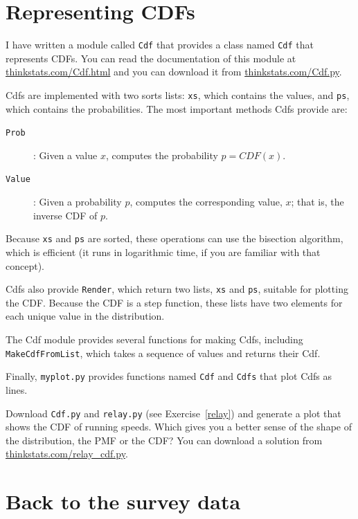 \documentclass[12pt]{book}
\begin{document}
\section{Representing CDFs}

I have written a module called {\tt Cdf} that provides a class named
{\tt Cdf} that represents CDFs.  You can read the documentation of
this module at \url{thinkstats.com/Cdf.html} and you can download it
from \url{thinkstats.com/Cdf.py}.

Cdfs are implemented with two sorts lists: {\tt xs}, which contains
the values, and {\tt ps}, which contains the probabilities.  The
most important methods Cdfs provide are:

\begin{description}

\item[{\tt Prob}]: Given a value $x$, computes the probability $p = CDF(x)$.

\item[{\tt Value}]: Given a probability $p$, computes the
corresponding value, $x$; that is, the inverse CDF of $p$.

\end{description}

Because {\tt xs} and {\tt ps} are sorted, these operations can use the
bisection algorithm, which is efficient (it runs in logarithmic time,
if you are familiar with that concept).

Cdfs also provide {\tt Render}, which return two lists, {\tt xs} and
{\tt ps}, suitable for plotting the CDF.  Because the CDF is a
step function, these lists have two elements for each unique
value in the distribution.

The Cdf module provides several functions for making Cdfs, including
{\tt MakeCdfFromList}, which takes a sequence of values
and returns their Cdf.

Finally, {\tt myplot.py} provides functions named {\tt Cdf} and
{\tt Cdfs} that plot Cdfs as lines.

\begin{ex}

Download {\tt Cdf.py} and \verb"relay.py" (see
Exercise~\ref{relay}) and generate a plot that shows the CDF of
running speeds.  Which gives you a better sense of the shape of the
distribution, the PMF or the CDF?  You can download a solution
from \url{thinkstats.com/relay_cdf.py}.

\end{ex}


\section{Back to the survey data}
\label{birth_weights}
\end{document}
